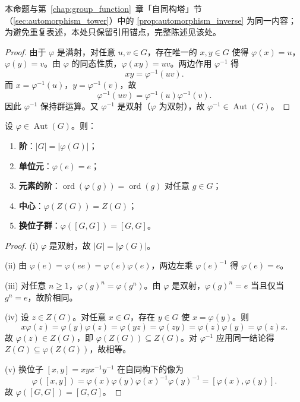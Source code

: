 \begin{proposition}[自同构的逆保持群运算]\label{prop:higher_automorphism_inverse}
本命题与第~\ref{chap:group_function}~章「自同构塔」节（\cref{sec:automorphism_tower}）中的 \cref{prop:automorphism_inverse} 为同一内容；为避免重复表述，本处只保留引用锚点，完整陈述见该处。
\end{proposition}

\begin{proof}
由于 $\varphi$ 是满射，对任意 $u,v \in G$，存在唯一的 $x,y \in G$ 使得 $\varphi(x)=u$，$\varphi(y)=v$。由 $\varphi$ 的同态性质，$\varphi(xy)=uv$。两边作用 $\varphi^{-1}$ 得
\[
xy = \varphi^{-1}(uv).
\]
而 $x=\varphi^{-1}(u)$，$y=\varphi^{-1}(v)$，故
\[
\varphi^{-1}(uv) = \varphi^{-1}(u)\varphi^{-1}(v).
\]
因此 $\varphi^{-1}$ 保持群运算。又 $\varphi^{-1}$ 是双射（$\varphi$ 为双射），故 $\varphi^{-1}\in\operatorname{Aut}(G)$。
\end{proof}

\begin{property}[自同构保持的群结构不变量]\label{prop:higher_automorphism_invariants}
设 $\varphi \in \operatorname{Aut}(G)$。则：
\begin{enumerate}[label=(\roman*)]
    \item \textbf{阶}：$|G| = |\varphi(G)|$；
    \item \textbf{单位元}：$\varphi(e) = e$；
    \item \textbf{元素的阶}：$\operatorname{ord}(\varphi(g)) = \operatorname{ord}(g)$ 对任意 $g\in G$；
    \item \textbf{中心}：$\varphi(Z(G)) = Z(G)$；
    \item \textbf{换位子群}：$\varphi([G,G]) = [G,G]$。
\end{enumerate}
\end{property}

\begin{proof}
(i) $\varphi$ 是双射，故 $|G| = |\varphi(G)|$。

(ii) 由 $\varphi(e) = \varphi(ee) = \varphi(e)\varphi(e)$，两边左乘 $\varphi(e)^{-1}$ 得 $\varphi(e)=e$。

(iii) 对任意 $n\ge 1$，$\varphi(g)^n = \varphi(g^n)$。由 $\varphi$ 是双射，$\varphi(g)^n = e$ 当且仅当 $g^n = e$，故阶相同。

(iv) 设 $z\in Z(G)$。对任意 $x\in G$，存在 $y\in G$ 使 $x=\varphi(y)$。则
\[
x\varphi(z) = \varphi(y)\varphi(z) = \varphi(yz) = \varphi(zy) = \varphi(z)\varphi(y) = \varphi(z)x.
\]
故 $\varphi(z)\in Z(G)$，即 $\varphi(Z(G))\subseteq Z(G)$。对 $\varphi^{-1}$ 应用同一结论得 $Z(G)\subseteq\varphi(Z(G))$，故相等。

(v) 换位子 $[x,y]=xyx^{-1}y^{-1}$ 在自同构下的像为
\[
\varphi([x,y]) = \varphi(x)\varphi(y)\varphi(x)^{-1}\varphi(y)^{-1} = [\varphi(x),\varphi(y)].
\]
故 $\varphi([G,G]) = [G,G]$。
\end{proof}

